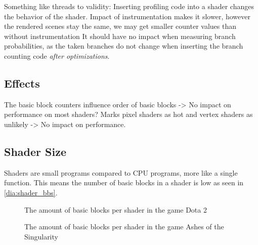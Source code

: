 \clearpage
{}
Something like threads to validity: Inserting profiling code into a shader changes the behavior of the shader.
Impact of instrumentation makes it slower, however the rendered scenes stay the same, we may get smaller counter values than without instrumentation
It should have no impact when measuring branch probabilities, as the taken branches do not change when inserting the branch counting code \emph{after optimizations}.

\subsection{Effects}
\label{sub:effets}
The basic block counters influence order of basic blocks -> No impact on performance on most shaders?
Marks pixel shaders as hot and vertex shaders as unlikely -> No impact on performance.

\subsection{Shader Size}
\label{sub:size}
Shaders are small programs compared to CPU programs, more like a single function. This means the number of basic blocks in a shader is low as seen in \cref{dia:shader_bbs}.

\begin{figure}
\begin{center}
\end{center}
\caption{The amount of basic blocks per shader in the game Dota 2}
\label{dia:shader_bbs_dota}
\end{figure}
\begin{figure}
\begin{center}
\end{center}
\caption{The amount of basic blocks per shader in the game Ashes of the Singularity}
\label{dia:shader_bbs_ashes}
\end{figure}

